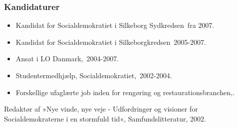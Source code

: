 \documentclass[11pt, a4paper]{awesome-cv}
\begin{document}
\begin{cvletter}
\subsubsection*{Kandidaturer}
\begin{itemize}
\item Kandidat for Socialdemokratiet i Silkeborg Sydkredsen fra 2007.
\item Kandidat for Socialdemokratiet i Silkeborgkredsen 2005-2007.
\end{itemize}
\begin{itemize}
\item Ansat i LO Danmark, 2004-2007.
\item Studentermedhjælp, Socialdemokratiet, 2002-2004.
\item Forskellige ufaglærte job inden for rengøring og restaurationsbranchen,.
\end{itemize}
Redaktør af »Nye vinde, nye veje - Udfordringer og visioner for Socialdemokraterne i en stormfuld tid«, Samfundslitteratur, 2002. 


\end{cvletter}
\end{document}
